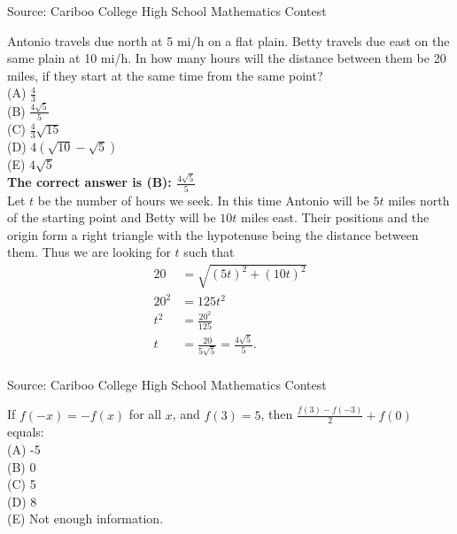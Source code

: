 \documentclass{article}
\begin{document}
\scriptsize
Source: Cariboo College High School Mathematics Contest

\normalsize
Antonio travels due north at 5 mi/h on a flat plain. Betty travels due east on the same plain at 10 mi/h. In how many hours will the distance between them be 20 miles, if they start at the same time from the same point?\\
(A) $\frac{4}{3}$\\
(B) $\frac{4\sqrt{5}}{5}$\\
(C) $\frac{4}{3}\sqrt{15}$\\
(D) $4(\sqrt{10}-\sqrt{5})$\\
(E) $4\sqrt{5}$\\


\textbf{The correct answer is (B): $\frac{4\sqrt{5}}{5}$}\\[1 ex]
Let $t$ be the number of hours we seek. In this time Antonio will be $5t$ miles north of the starting point and Betty will be $10t$ miles east.  Their positions and the origin form a right triangle with the hypotenuse being the distance between them. Thus we are looking for $t$ such that 
\begin{align*}
20&=\sqrt{(5t)^2+(10t)^2}\\
20^2&=125t^2\\
t^2&=\frac{20^2}{125}\\
t&=\frac{20}{5\sqrt{5}}=\frac{4\sqrt{5}}{5}.
\end{align*}
\\[5 ex]

\scriptsize
Source: Cariboo College High School Mathematics Contest

\normalsize
If $f(-x)=-f(x)$ for all $x$, and $f(3)=5$, then $\frac{f(3)-f(-3)}{2}+f(0)$ equals:\\
(A) -5\\
(B) 0\\
(C) 5\\
(D) 8\\
(E) Not enough information.\\
\end{document}

